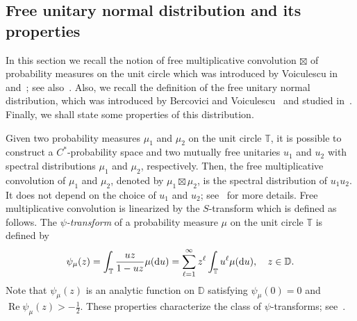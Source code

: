 \documentclass[AHL,Unicode,longabstracts,published]{cedram}
\DeclareMathOperator{\Ree}{Re}
\newcommand{\bT}{\mathbb{T}}
\newcommand{\bD}{\mathbb{D}}
\newcommand*\dint{\text{\normalfont d}}
\begin{document}
\subsection{Free unitary normal distribution and its properties}\label{sec:free_unitary_normal}


In this section we recall the notion of free multiplicative convolution $\boxtimes$ of probability measures on the unit circle which was introduced by Voiculescu in~\cite{voiculescu_symmetries} and~\cite{voiculescu_multiplication}; see also~\cite[\S 3.6]{voiculescu_nica_dykema_book}. Also, we recall the definition of the free unitary normal distribution, which was introduced by Bercovici and Voiculescu~\cite{bercovici_voiculescu_levy_hincin} and studied in~\cite{biane,biane_segal_bargmann,cebron,
zhong_free_brownian,zhong_free_normal}. Finally, we shall state some properties of this distribution.

Given two probability measures $\mu_1$ and $\mu_2$ on the unit circle $\bT$, it is possible to construct a $C^*$-probability space and two mutually free unitaries $u_1$ and $u_2$ with spectral distributions $\mu_1$ and $\mu_2$, respectively. Then, the free multiplicative convolution of $\mu_1$ and $\mu_2$, denoted by $\mu_1 \boxtimes \mu_2$, is the spectral distribution of $u_1 u_2$. It does not depend on the choice of $u_1$ and $u_2$; see~\cite{voiculescu_nica_dykema_book} for more details. Free multiplicative convolution is linearized by the $S$-transform which is defined as follows. The \emph{$\psi$-transform} of a probability measure $\mu$ on the unit circle $\bT$ is defined by
\begin{equation}\label{eq:psi_trafo_def}
\psi_{\mu}(z) =
\int_\bT \frac{uz}{1-uz} \mu(\dint u) = \sum_{\ell=1}^\infty z^\ell \int_{\bT} u^\ell \mu(\dint u),
\quad z\in \bD.
\end{equation}
Note that $\psi_\mu(z)$ is an analytic function on $\bD$ satisfying $\psi_\mu(0) = 0$ and $\Ree \psi_\mu(z) > - \frac 12$. These properties characterize the class of $\psi$-transforms; see~\cite[Lemma~2.9]{franz_hasebe_schleissinger_monotone}.
\end{document}
